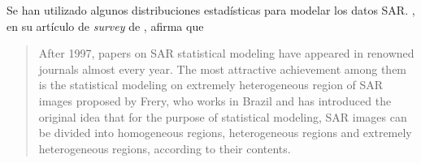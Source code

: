 
Se han utilizado algunos distribuciones estadísticas para modelar los datos SAR.
\citeauthor{Gao2010}, en su artículo de \textit{survey} de \citeyear{Gao2010}, afirma que
\begin{quote}
After 1997, papers on SAR statistical modeling have appeared in renowned journals almost every year. The most attractive achievement among them is the statistical modeling on extremely heterogeneous region of SAR images proposed by Frery, who works in Brazil and has introduced the original idea that for the purpose of statistical modeling, SAR images can be divided into homogeneous regions, heterogeneous regions and extremely heterogeneous regions, according to their contents.
\end{quote}

